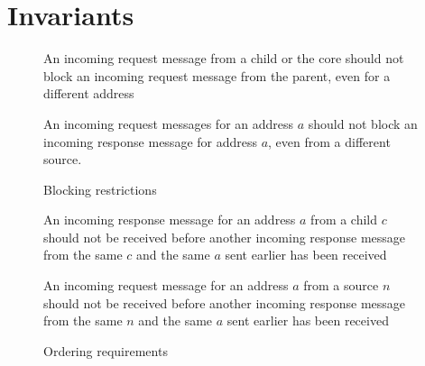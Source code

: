 \section{Invariants}
\label{sec:invariants}


\begin{figure}\small
\begin{inv}
An incoming request message from a child or the core should not block an
incoming request message from the parent, even for a different
address\label{cReqNoBlockPReq}
\end{inv}
\begin{inv}
An incoming request messages for an address $a$ should not block an incoming
response message for address $a$, even from a different
source.\label{reqNoBlockResp}
\end{inv}
\caption{Blocking restrictions}
\label{blocking}
\end{figure}

\begin{figure}\small
\begin{inv}
An incoming response message for an address $a$ from a child $c$ should not be
received before another incoming response message from the same $c$ and the
same $a$ sent earlier has been received\label{cRespFifo}
\end{inv}
\begin{inv}
An incoming request message for an address $a$ from a source $n$ should not be
received before another incoming response message from the same $n$ and the
same $a$ sent earlier has been received\label{reqNoOvertakeResp}
\end{inv}
\caption{Ordering requirements}
\label{order}
\end{figure}

